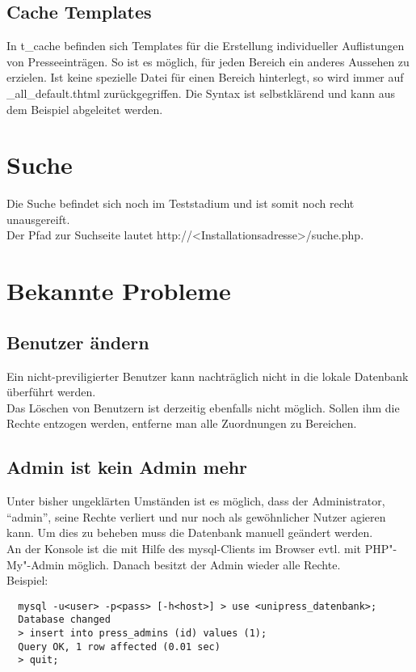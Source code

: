 \documentclass[a4paper,10pt,twoside]{article}
\begin{document}
\subsection{Cache Templates}
In \textsf{t\_cache} befinden sich Templates für die Erstellung individueller
Auflistungen von Presseeinträgen. So ist es möglich, für jeden Bereich ein
anderes Aussehen zu erzielen. Ist keine spezielle Datei für einen Bereich
hinterlegt, so wird immer auf \textsf{\_all\_default.thtml} zurückgegriffen. Die
Syntax ist selbstklärend und kann aus dem Beispiel abgeleitet werden.

\section{Suche}
 Die Suche befindet sich noch im Teststadium und ist somit noch recht
 unausgereift. \\ 
 Der Pfad zur Suchseite lautet \textsf{http://<Installationsadresse>/suche.php}.


\section{Bekannte Probleme}
 \subsection{Benutzer ändern}
  Ein nicht-previligierter Benutzer kann nachträglich nicht in die lokale 
  Datenbank überführt werden.\\
  Das Löschen von Benutzern ist derzeitig ebenfalls nicht möglich. Sollen ihm
  die Rechte entzogen werden, entferne man alle Zuordnungen zu Bereichen.
 \subsection{Admin ist kein Admin mehr}
  Unter bisher ungeklärten Umständen ist es möglich, dass der Administrator, 
  ``admin'',  seine Rechte verliert und nur noch als gewöhnlicher Nutzer 
  agieren kann. Um dies zu beheben muss die Datenbank manuell geändert werden.\\
  An der Konsole ist die mit Hilfe des mysql-Clients im Browser evtl. mit 
  PHP"-My"-Admin möglich. Danach besitzt der Admin wieder alle Rechte.\\
  Beispiel:
%
  {\tiny
	\begin{lstlisting}
  mysql -u<user> -p<pass> [-h<host>] > use <unipress_datenbank>; 
  Database changed 
  > insert into press_admins (id) values (1); 
  Query OK, 1 row affected (0.01 sec) 
  > quit;
	\end{lstlisting}
  }
\end{document}
